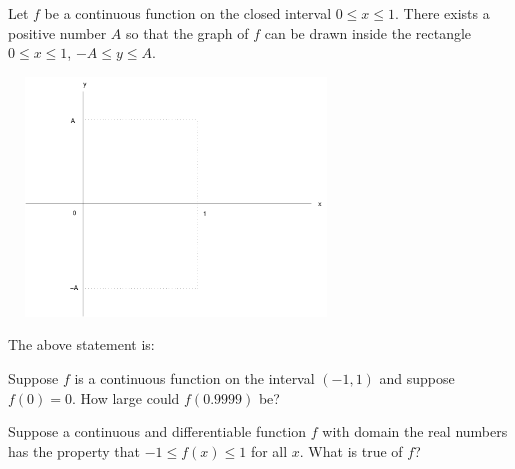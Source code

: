 \documentclass{ximera}
\newcommand{\recommendation}[1]{}
\newcommand{\GoodQuestions}[1]{}
\begin{document}
\begin{problem}
  \recommendation{Vic}
  \GoodQuestions{Subject: Maximum and minimum values 3P}
  
  Let $f$ be a continuous function on the closed interval $0\leq x\leq
  1$. There exists a positive number $A$ so that the graph of $f$ can
  be drawn inside the rectangle $0\leq x\leq 1$, $-A\leq y\leq A$.
  \begin{image}
    \includegraphics[height=2.5in,width=3.5in]{42_1.pdf}
  \end{image}
  The above statement is:  
  \begin{multipleChoice}
  \end{multipleChoice}
\end{problem}

\begin{problem}
\recommendation{Vic}
  Suppose $f$ is a continuous function on the interval $(-1,1)$ and suppose $f(0) = 0$.  How large could $f(0.9999)$ be?
  \begin{multipleChoice}
  \end{multipleChoice}
\end{problem}

\begin{problem}
  Suppose a continuous and differentiable function $f$ with domain the
  real numbers has the property that $-1 \leq f(x) \leq 1$ for all
  $x$.  What is true of $f$?
  \begin{multipleChoice}
  \end{multipleChoice}
\end{problem}
\end{document}
